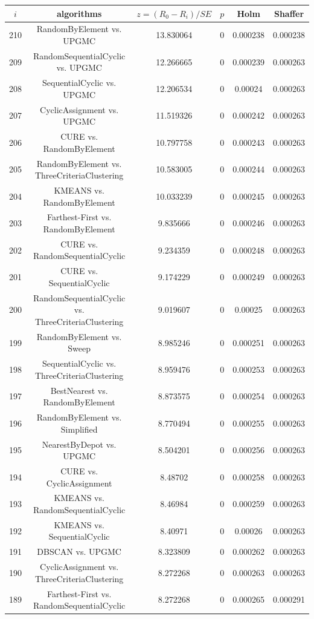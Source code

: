 \documentclass[a4paper,10pt]{article}
\begin{document}
\begin{landscape}
\begin{table}[!htp]
\centering\scriptsize
\begin{tabular}{cccccc}
$i$&algorithms&$z=(R_0 - R_i)/SE$&$p$&Holm&Shaffer\\
\hline210&RandomByElement vs. UPGMC&13.830064&0&0.000238&0.000238\\
209&RandomSequentialCyclic vs. UPGMC&12.266665&0&0.000239&0.000263\\
208&SequentialCyclic vs. UPGMC&12.206534&0&0.00024&0.000263\\
207&CyclicAssignment vs. UPGMC&11.519326&0&0.000242&0.000263\\
206&CURE vs. RandomByElement&10.797758&0&0.000243&0.000263\\
205&RandomByElement vs. ThreeCriteriaClustering&10.583005&0&0.000244&0.000263\\
204&KMEANS vs. RandomByElement&10.033239&0&0.000245&0.000263\\
203&Farthest-First vs. RandomByElement&9.835666&0&0.000246&0.000263\\
202&CURE vs. RandomSequentialCyclic&9.234359&0&0.000248&0.000263\\
201&CURE vs. SequentialCyclic&9.174229&0&0.000249&0.000263\\
200&RandomSequentialCyclic vs. ThreeCriteriaClustering&9.019607&0&0.00025&0.000263\\
199&RandomByElement vs. Sweep&8.985246&0&0.000251&0.000263\\
198&SequentialCyclic vs. ThreeCriteriaClustering&8.959476&0&0.000253&0.000263\\
197&BestNearest vs. RandomByElement&8.873575&0&0.000254&0.000263\\
196&RandomByElement vs. Simplified&8.770494&0&0.000255&0.000263\\
195&NearestByDepot vs. UPGMC&8.504201&0&0.000256&0.000263\\
194&CURE vs. CyclicAssignment&8.48702&0&0.000258&0.000263\\
193&KMEANS vs. RandomSequentialCyclic&8.46984&0&0.000259&0.000263\\
192&KMEANS vs. SequentialCyclic&8.40971&0&0.00026&0.000263\\
191&DBSCAN vs. UPGMC&8.323809&0&0.000262&0.000263\\
190&CyclicAssignment vs. ThreeCriteriaClustering&8.272268&0&0.000263&0.000263\\
189&Farthest-First vs. RandomSequentialCyclic&8.272268&0&0.000265&0.000291\\

\end{tabular}
\end{table}
\end{landscape}
\end{document}
